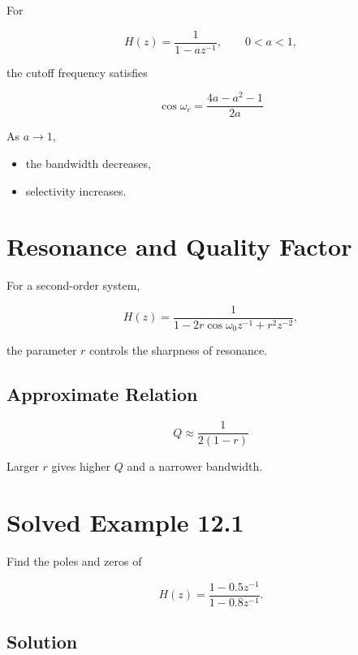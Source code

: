 For

\[
H(z)=
\frac{1}{1-az^{-1}},
\qquad 0<a<1,
\]

the cutoff frequency satisfies

\[
\boxed{
\cos\omega_c=
\frac{4a-a^2-1}{2a}
}
\]

As \(a\to1\),

\begin{itemize}
\item the bandwidth decreases,
\item selectivity increases.
\end{itemize}


\section{Resonance and Quality Factor}

For a second-order system,

\[
H(z)=
\frac{1}
{1-2r\cos\omega_0 z^{-1}+r^2 z^{-2}},
\]

the parameter \(r\) controls the sharpness of resonance.


\subsection{Approximate Relation}

\[
\boxed{
Q\approx\frac{1}{2(1-r)}
}
\]

Larger \(r\) gives higher \(Q\) and a narrower bandwidth.


\section{Solved Example 12.1}

Find the poles and zeros of

\[
H(z)=
\frac{1-0.5z^{-1}}
{1-0.8z^{-1}}.
\]


\subsection{Solution}

